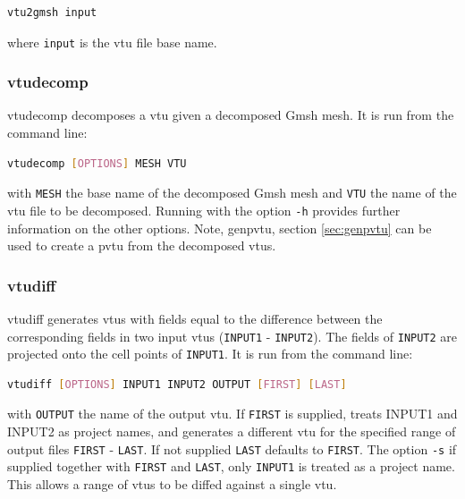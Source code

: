 \begin{lstlisting}[language = Bash]
vtu2gmsh input
\end{lstlisting}

where \lstinline+input+ is the vtu file base name.


\subsubsection{vtudecomp}
\label{sec:vtudecomp}

vtudecomp decomposes a vtu given a decomposed Gmsh mesh. It is run from the command line:
\begin{lstlisting}[language = Bash]
vtudecomp [OPTIONS] MESH VTU
\end{lstlisting}
with \lstinline[language = Bash]+MESH+ the base name of the decomposed Gmsh mesh and \lstinline[language = Bash]+VTU+ the name of the vtu file to be decomposed. Running with the option \lstinline[language = Bash]+-h+ provides further information on the other options. Note, genpvtu, section \ref{sec:genpvtu} can be used to create a pvtu from the decomposed vtus.


\subsubsection{vtudiff}
\label{sec:vtudiff}

vtudiff generates vtus with fields equal to the difference between the corresponding fields in two input vtus (\lstinline[language = Bash]+INPUT1+ - \lstinline[language = Bash]+INPUT2+). The fields of \lstinline[language = Bash]+INPUT2+ are projected onto the cell points of \lstinline[language = Bash]+INPUT1+. It is run from the command line:
\begin{lstlisting}[language = Bash]
vtudiff [OPTIONS] INPUT1 INPUT2 OUTPUT [FIRST] [LAST]
\end{lstlisting}
with \lstinline[language = Bash]+OUTPUT+ the name of the output vtu. If \lstinline[language = Bash]+FIRST+ is supplied, treats INPUT1 and INPUT2 as project names, and generates a different vtu for the specified range of output files \lstinline[language = Bash]+FIRST+ - \lstinline[language = Bash]+LAST+. If not supplied \lstinline[language = Bash]+LAST+ defaults to \lstinline[language = Bash]+FIRST+. The option \lstinline[language = Bash]+-s+ if supplied together with \lstinline[language = Bash]+FIRST+ and \lstinline[language = Bash]+LAST+, only \lstinline[language = Bash]+INPUT1+ is treated as a project name. This allows a range of vtus to be diffed against a single vtu.

